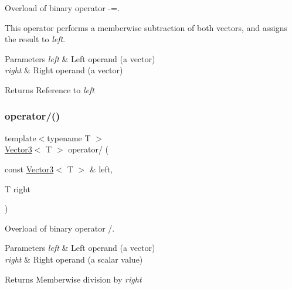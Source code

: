 Overload of binary operator -\/=. 

This operator performs a memberwise subtraction of both vectors, and assigns the result to {\itshape left}.


\begin{DoxyParams}{Parameters}
{\em left} & Left operand (a vector) \\
\hline
{\em right} & Right operand (a vector)\\
\hline
\end{DoxyParams}
\begin{DoxyReturn}{Returns}
Reference to {\itshape left} 
\end{DoxyReturn}
\mbox{\label{classsf_1_1_vector3_ad4ba4a83de236ddeb92a7b759187e90d}} 
\subsubsection{\texorpdfstring{operator/()}{operator/()}}
{\footnotesize\ttfamily template$<$typename T $>$ \\
\hyperlink{classsf_1_1_vector3}{Vector3}$<$ T $>$ operator/ (\begin{DoxyParamCaption}\item[{const \hyperlink{classsf_1_1_vector3}{Vector3}$<$ T $>$ \&}]{left,  }\item[{T}]{right }\end{DoxyParamCaption})\hspace{0.3cm}{\ttfamily [related]}}



Overload of binary operator /. 


\begin{DoxyParams}{Parameters}
{\em left} & Left operand (a vector) \\
\hline
{\em right} & Right operand (a scalar value)\\
\hline
\end{DoxyParams}
\begin{DoxyReturn}{Returns}
Memberwise division by {\itshape right} 
\end{DoxyReturn}
\mbox{\label{classsf_1_1_vector3_a8995a700f9dffccc6dddb3696ae17b64}} 
